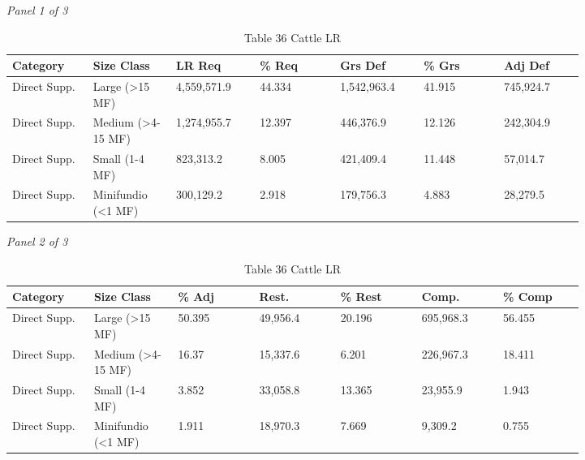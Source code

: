 \documentclass[12pt]{article}
\begin{document}
\begin{landscape}
\begin{table}[H]
\centering
\caption{Table 36 Cattle LR}
\textit{Panel 1 of 3}\\[2pt]
{\fontsize{12}{14}\selectfont
\setlength{\tabcolsep}{3pt}
\renewcommand{\arraystretch}{1.08}
\begin{tabular}{p{0.117\linewidth}p{0.117\linewidth}p{0.117\linewidth}p{0.117\linewidth}p{0.117\linewidth}p{0.117\linewidth}p{0.117\linewidth}}
\toprule
Category & Size Class & LR Req & \% Req & Grs Def & \% Grs & Adj Def \\
\midrule
Direct Supp. & Large (>15 MF) & 4,559,571.9 & 44.334 & 1,542,963.4 & 41.915 & 745,924.7 \\
Direct Supp. & Medium (>4-15 MF) & 1,274,955.7 & 12.397 & 446,376.9 & 12.126 & 242,304.9 \\
Direct Supp. & Small (1-4 MF) & 823,313.2 & 8.005 & 421,409.4 & 11.448 & 57,014.7 \\
Direct Supp. & Minifundio (<1 MF) & 300,129.2 & 2.918 & 179,756.3 & 4.883 & 28,279.5 \\
\bottomrule
\end{tabular}
}

\vspace{0.6em}

\textit{Panel 2 of 3}\\[2pt]
{\fontsize{12}{14}\selectfont
\setlength{\tabcolsep}{3pt}
\renewcommand{\arraystretch}{1.08}
\begin{tabular}{p{0.117\linewidth}p{0.117\linewidth}p{0.117\linewidth}p{0.117\linewidth}p{0.117\linewidth}p{0.117\linewidth}p{0.117\linewidth}}
\toprule
Category & Size Class & \% Adj & Rest. & \% Rest & Comp. & \% Comp \\
\midrule
Direct Supp. & Large (>15 MF) & 50.395 & 49,956.4 & 20.196 & 695,968.3 & 56.455 \\
Direct Supp. & Medium (>4-15 MF) & 16.37 & 15,337.6 & 6.201 & 226,967.3 & 18.411 \\
Direct Supp. & Small (1-4 MF) & 3.852 & 33,058.8 & 13.365 & 23,955.9 & 1.943 \\
Direct Supp. & Minifundio (<1 MF) & 1.911 & 18,970.3 & 7.669 & 9,309.2 & 0.755 \\
\bottomrule
\end{tabular}
}

\vspace{0.6em}


\end{table}
\end{landscape}
\end{document}

